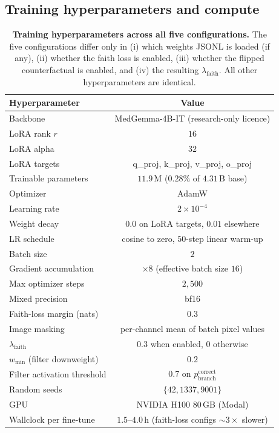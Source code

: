 \documentclass{article}
\begin{document}
\subsection{Training hyperparameters and compute}
\label{app:hyper}

\begin{table}[t]
\centering
\small
\caption{\textbf{Training hyperparameters across all five configurations.}
The five configurations differ only in (i) which weights JSONL is loaded
(if any), (ii) whether the faith loss is enabled, (iii) whether the
flipped counterfactual is enabled, and (iv) the resulting
$\lambda_{\mathrm{faith}}$. All other hyperparameters are identical.}
\label{tab:hyper}
\begin{tabular}{lc}
\toprule
\textbf{Hyperparameter} & \textbf{Value}\\
\midrule
Backbone                          & MedGemma-4B-IT (research-only licence)\\
LoRA rank $r$                     & $16$\\
LoRA alpha                        & $32$\\
LoRA targets                      & q\_proj, k\_proj, v\_proj, o\_proj\\
Trainable parameters              & $11.9$\,M ($0.28\%$ of $4.31$\,B base)\\
Optimizer                         & AdamW\\
Learning rate                     & $2\times 10^{-4}$\\
Weight decay                      & $0.0$ on LoRA targets, $0.01$ elsewhere\\
LR schedule                       & cosine to zero, $50$-step linear warm-up\\
Batch size                        & $2$\\
Gradient accumulation             & $\times 8$ (effective batch size $16$)\\
Max optimizer steps               & $2{,}500$\\
Mixed precision                   & bf16\\
Faith-loss margin (nats)          & $0.3$\\
Image masking                     & per-channel mean of batch pixel values\\
$\lambda_{\mathrm{faith}}$        & $0.3$ when enabled, $0$ otherwise\\
$w_{\min}$ (filter downweight)    & $0.2$\\
Filter activation threshold       & $0.7$ on $p_{\text{branch}}^{\text{correct}}$\\
Random seeds                      & $\{42, 1337, 9001\}$\\
GPU                               & NVIDIA H100 80\,GB (Modal)\\
Wallclock per fine-tune           & $1.5$--$4.0$\,h (faith-loss configs $\sim 3\times$ slower)\\
\bottomrule
\end{tabular}
\end{table}
\end{document}
